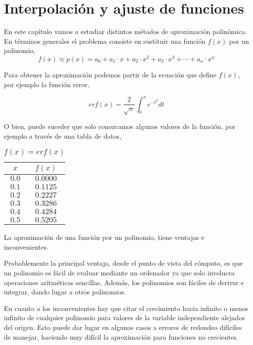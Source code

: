 \chapter{Interpolación y ajuste de funciones}\label{interpolacion}
En este capítulo vamos a estudiar distintos métodos de aproximación polinómica. En términos generales el problema consiste en sustituir una función $f(x)$ por un polinomio,
\begin{equation*}
f(x)\approx p(x)=a_0+a_1\cdot x+a_2\cdot x^2+a_3\cdot x^3+\cdots +a_n \cdot x^n
\end{equation*}

Para obtener la aproximación podemos partir de la ecuación que define $f(x)$,  por ejemplo la función error,

\begin{equation*}
erf(x)=\frac{2}{\sqrt{\pi}}\int_0^x e^{-t^2}dt
\end{equation*}

O bien, puede suceder que solo conozcamos algunos valores de la función, por ejemplo a través de una tabla de datos,

\begin{table}[h]
\caption{$f(x)=erf(x)$}
\centering
\begin{tabular}{c|c}
$x$&$f(x)$\\ 
\hline
$0.0$& $0.0000$\\
$0.1$&$0.1125$\\
$0.2$&$0.2227$\\
$0.3$&$0.3286$\\
$0.4$&$0.4284$\\
$0.5$&$0.5205$\\
\end{tabular}
\label{tpuntos2}
\end{table}
 
La aproximación de una función por un polinomio, tiene ventajas e inconvenientes. 

Probablemente la principal ventaja, desde el punto de vista del cómputo, es que un polinomio es fácil de evaluar  mediante un ordenador ya que solo involucra operaciones aritméticas sencillas. Además, los polinomios son fáciles de derivar e integrar, dando lugar a otros polinomios.

En cuanto a los inconvenientes hay que citar el crecimiento hacia infinito o menos infinito de cualquier polinomio para valores de la variable independiente alejados del origen. Esto puede dar lugar en algunos casos a errores de redondeo difíciles de manejar, haciendo muy difícil la aproximación para funciones no crecientes.

